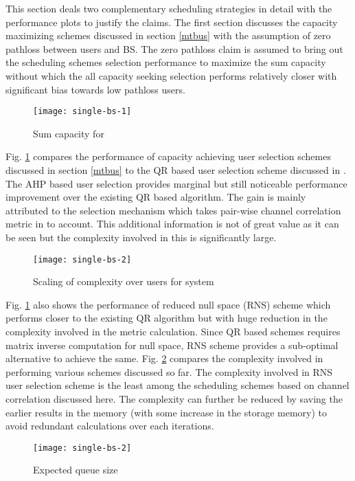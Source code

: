
This section deals two complementary scheduling strategies in detail with the performance plots to justify the claims. The first section discusses the capacity maximizing schemes discussed in section \ref{mtbus} with the assumption of zero pathloss between users and BS. The zero pathloss claim is assumed to bring out the scheduling schemes selection performance to maximize the sum capacity without which the all capacity seeking selection performs relatively closer with significant bias towards low pathloss users.
\begin{figure}
\centering
\texttt{[image: single-bs-1]}
\caption[short]{Sum capacity for }
\label{single-bs-f1}
\end{figure}

Fig. \ref{single-bs-f1} compares the performance of capacity achieving user selection schemes discussed in section \ref{mtbus} to the QR based user selection scheme discussed in \cite{antti_user_selection,jin2010novel}. The AHP based user selection provides marginal but still noticeable performance improvement over the existing QR based algorithm. The gain is mainly attributed to the selection mechanism which takes pair-wise channel correlation metric in to account. This additional information is not of great value as it can be seen but the complexity involved in this is significantly large.
\begin{figure}
\centering
\texttt{[image: single-bs-2]}
\caption[short]{Scaling of complexity over users for  system}
\label{single-bs-f2}
\end{figure}

Fig. \ref{single-bs-f1} also shows the performance of reduced null space (RNS) scheme which performs closer to the existing QR algorithm but with huge reduction in the complexity involved in the metric calculation. Since QR based schemes requires matrix inverse computation for null space, RNS scheme provides a sub-optimal alternative to achieve the same. Fig. \ref{single-bs-f2} compares the complexity involved in performing various schemes discussed so far. The complexity involved in RNS user selection scheme is the least among the scheduling schemes based on channel correlation discussed here. The complexity can further be reduced by saving the earlier results in the memory (with some increase in the storage memory) to avoid redundant calculations over each iterations.
\begin{figure}
\centering
\texttt{[image: single-bs-2]}
\caption[short]{Expected queue size }
\label{single-bs-f3}
\end{figure}

